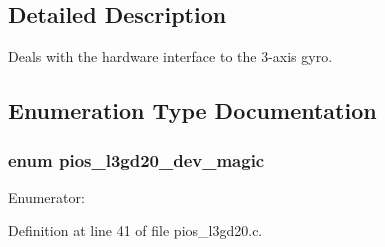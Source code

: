 \subsection{\-Detailed \-Description}
\-Deals with the hardware interface to the 3-\/axis gyro. 

\subsection{\-Enumeration \-Type \-Documentation}
\hypertarget{group___p_i_o_s___l3_g_d20_ga34e70adc9970e3e83c4d39e720087df3}{
\subsubsection[{pios\-\_\-l3gd20\-\_\-dev\-\_\-magic}]{\setlength{\rightskip}{0pt plus 5cm}enum {\bf pios\-\_\-l3gd20\-\_\-dev\-\_\-magic}}}\label{group___p_i_o_s___l3_g_d20_ga34e70adc9970e3e83c4d39e720087df3}
\begin{Desc}
\item[\-Enumerator\-: ]\par
\begin{description}
\item[{\em 
\hypertarget{group___p_i_o_s___l3_g_d20_gga34e70adc9970e3e83c4d39e720087df3a8ff24655b5a2966b5bdf02704790f7c1}{\-P\-I\-O\-S\-\_\-\-L3\-G\-D20\-\_\-\-D\-E\-V\-\_\-\-M\-A\-G\-I\-C}\label{group___p_i_o_s___l3_g_d20_gga34e70adc9970e3e83c4d39e720087df3a8ff24655b5a2966b5bdf02704790f7c1}
}]\end{description}
\end{Desc}



\-Definition at line 41 of file pios\-\_\-l3gd20.\-c.

